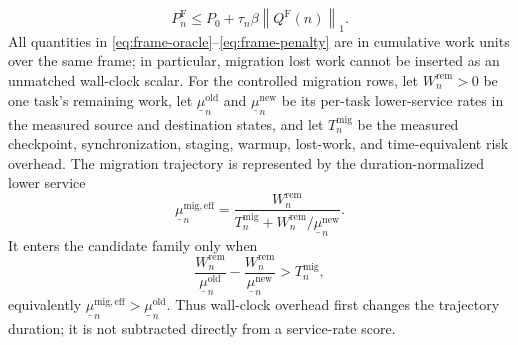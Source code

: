 \documentclass[opre,dblanonrev]{informs4}
\newcommand{\normone}[1]{\left\|#1\right\|_1}
\begin{document}
\begin{equation}
  P_n^{\mathrm F}
  \le P_0+\tau_n\beta\normone{Q^{\mathrm F}(n)}.
  \label{eq:frame-penalty}
\end{equation}
All quantities in \eqref{eq:frame-oracle}--\eqref{eq:frame-penalty} are in
cumulative work units over the same frame; in particular, migration lost work
cannot be inserted as an unmatched wall-clock scalar.
For the controlled migration rows, let \(W_n^{\mathrm{rem}}>0\) be one task's
remaining work, let \(\underline\mu_n^{\mathrm{old}}\) and
\(\underline\mu_n^{\mathrm{new}}\) be its per-task lower-service rates in the
measured source and destination states, and let \(T_n^{\mathrm{mig}}\) be the
measured checkpoint, synchronization, staging, warmup, lost-work, and
time-equivalent risk overhead.  The migration trajectory is represented by
the duration-normalized lower service
\begin{equation}
  \underline\mu_n^{\mathrm{mig,eff}}
  =
  \frac{W_n^{\mathrm{rem}}}
  {T_n^{\mathrm{mig}}+W_n^{\mathrm{rem}}/
    \underline\mu_n^{\mathrm{new}}}.
  \label{eq:migration-effective-lower-service}
\end{equation}
It enters the candidate family only when
\begin{equation}
  \frac{W_n^{\mathrm{rem}}}{\underline\mu_n^{\mathrm{old}}}
  -
  \frac{W_n^{\mathrm{rem}}}{\underline\mu_n^{\mathrm{new}}}
  > T_n^{\mathrm{mig}},
  \label{eq:migration-dimensional-admission}
\end{equation}
equivalently
\(\underline\mu_n^{\mathrm{mig,eff}}>
\underline\mu_n^{\mathrm{old}}\).  Thus wall-clock overhead first changes the
trajectory duration; it is not subtracted directly from a service-rate score.
\end{document}
